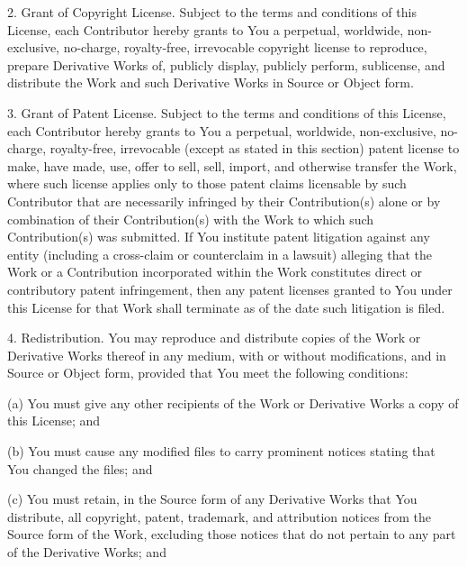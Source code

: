 \documentclass[twoside]{tceusermanual}
\begin{document}
   2. Grant of Copyright License. Subject to the terms and conditions of
      this License, each Contributor hereby grants to You a perpetual,
      worldwide, non-exclusive, no-charge, royalty-free, irrevocable
      copyright license to reproduce, prepare Derivative Works of,
      publicly display, publicly perform, sublicense, and distribute the
      Work and such Derivative Works in Source or Object form.

   3. Grant of Patent License. Subject to the terms and conditions of
      this License, each Contributor hereby grants to You a perpetual,
      worldwide, non-exclusive, no-charge, royalty-free, irrevocable
      (except as stated in this section) patent license to make, have made,
      use, offer to sell, sell, import, and otherwise transfer the Work,
      where such license applies only to those patent claims licensable
      by such Contributor that are necessarily infringed by their
      Contribution(s) alone or by combination of their Contribution(s)
      with the Work to which such Contribution(s) was submitted. If You
      institute patent litigation against any entity (including a
      cross-claim or counterclaim in a lawsuit) alleging that the Work
      or a Contribution incorporated within the Work constitutes direct
      or contributory patent infringement, then any patent licenses
      granted to You under this License for that Work shall terminate
      as of the date such litigation is filed.

   4. Redistribution. You may reproduce and distribute copies of the
      Work or Derivative Works thereof in any medium, with or without
      modifications, and in Source or Object form, provided that You
      meet the following conditions:

      (a) You must give any other recipients of the Work or
          Derivative Works a copy of this License; and

      (b) You must cause any modified files to carry prominent notices
          stating that You changed the files; and

      (c) You must retain, in the Source form of any Derivative Works
          that You distribute, all copyright, patent, trademark, and
          attribution notices from the Source form of the Work,
          excluding those notices that do not pertain to any part of
          the Derivative Works; and
\end{document}
